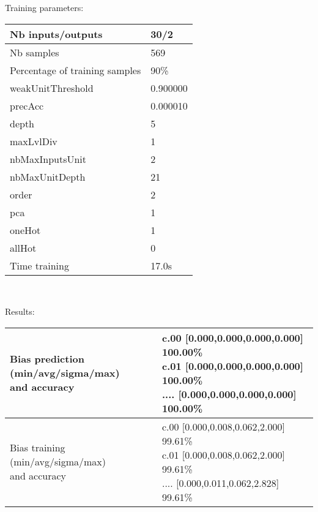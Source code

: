 Training parameters:\\
\begin{center}
\begin{tabular}{|l|l|}
\hline
Nb inputs/outputs&30/2\\
\hline
Nb samples&569\\
\hline
Percentage of training samples&90\%\\
\hline
weakUnitThreshold&0.900000\\
\hline
precAcc&0.000010\\
\hline
depth&5\\
\hline
maxLvlDiv&1\\
\hline
nbMaxInputsUnit&2\\
\hline
nbMaxUnitDepth&21\\
\hline
order&2\\
\hline
pca&1\\
\hline
oneHot&1\\
\hline
allHot&0\\
\hline
Time training&17.0s\\
\hline
\end{tabular}\\
\end{center}\newline
Results:
\begin{center}
\begin{tabular}{|l|l|}
\hline
\makecell{Bias prediction (min/avg/sigma/max)\\and accuracy}&\makecell{c.00 [0.000,0.000,0.000,0.000] 100.00\%\\
c.01 [0.000,0.000,0.000,0.000] 100.00\%\\
.... [0.000,0.000,0.000,0.000] 100.00\%\\
}\\

\hline
\makecell{Bias training (min/avg/sigma/max)\\and accuracy}&\makecell{c.00 [0.000,0.008,0.062,2.000] 99.61\%\\
c.01 [0.000,0.008,0.062,2.000] 99.61\%\\
.... [0.000,0.011,0.062,2.828] 99.61\%\\
}\\
\hline
\end{tabular}\
\end{center}

